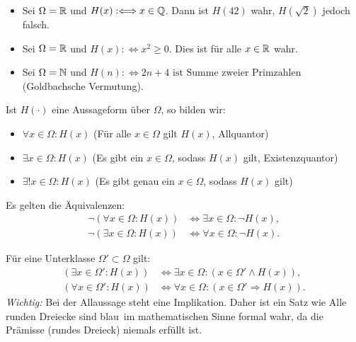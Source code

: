 \begin{beispiel}
\begin{itemize}
    \item Sei $\Omega = \mathbb{R}$ und $H(x) :\Longleftrightarrow x \in \mathbb{Q}$. Dann ist $H(42)$ wahr, $H(\sqrt{2})$ jedoch falsch.
    \item Sei $\Omega = \mathbb{R}$ und $H(x) :\Longleftrightarrow x^2 \ge 0$. Dies ist für alle $x \in \mathbb{R}$ wahr.
    \item Sei $\Omega = \mathbb{N}$ und $H(n) :\Longleftrightarrow 2n+4 \text{ ist Summe zweier Primzahlen}$ (Goldbachsche Vermutung).
\end{itemize}
\end{beispiel}

\begin{definition}
Ist $H(\cdot)$ eine Aussageform über $\Omega$, so bilden wir:
\begin{itemize}
    \item $\forall x \in \Omega : H(x)$ \quad (\glqq Für alle $x \in \Omega$ gilt $H(x)$\grqq, Allquantor)
    \item $\exists x \in \Omega : H(x)$ \quad (\glqq Es gibt ein $x \in \Omega$, sodass $H(x)$ gilt\grqq, Existenzquantor)
    \item $\exists! x \in \Omega : H(x)$ \quad (\glqq Es gibt genau ein $x \in \Omega$, sodass $H(x)$ gilt\grqq)
\end{itemize}
\end{definition}

\begin{satz}
Es gelten die Äquivalenzen:
\begin{align*}
    \neg(\forall x \in \Omega : H(x)) &\Longleftrightarrow \exists x \in \Omega : \neg H(x), \\
    \neg(\exists x \in \Omega : H(x)) &\Longleftrightarrow \forall x \in \Omega : \neg H(x).
\end{align*}
\end{satz}

\begin{bemerkung}
Für eine Unterklasse $\Omega' \subset \Omega$ gilt:
\begin{align*}
    (\exists x \in \Omega' : H(x)) &\Longleftrightarrow \exists x \in \Omega : (x \in \Omega' \land H(x)), \\
    (\forall x \in \Omega' : H(x)) &\Longleftrightarrow \forall x \in \Omega : (x \in \Omega' \Longrightarrow H(x)).
\end{align*}
\emph{Wichtig:} Bei der Allaussage steht eine Implikation. Daher ist ein Satz wie \glqq Alle runden Dreiecke sind blau\grqq\ im mathematischen Sinne formal wahr, da die Prämisse (rundes Dreieck) niemals erfüllt ist.
\end{bemerkung}

